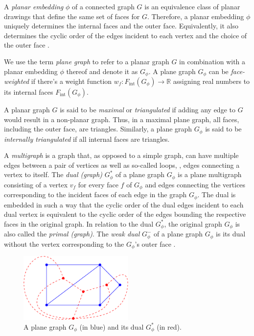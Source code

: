 
A \emph{planar embedding} $\phi$ of a connected graph $G$ is an equivalence class of planar drawings that define the same set of faces for $G$.
Therefore, a planar embedding $\phi$ uniquely determines the internal faces and the outer face.
Equivalently, it also determines the cyclic order of the edges incident to each vertex and the choice of the outer face \cite{angelini2015monotone}.

We use the term \emph{plane graph} to refer to a planar graph $G$ in combination with a planar embedding $\phi$ thereof and denote it as $G_\phi$.
A plane graph $G_\phi$ can be \emph{face-weighted} if there's a weight function $w_f \colon F_\text{int}(G_\phi) \to \mathbb{R}$ assigning real numbers to its internal faces $F_\text{int}(G_\phi)$.


A planar graph $G$ is said to be \emph{maximal} or \emph{triangulated} if adding any edge to $G$ would result in a non-planar graph.
Thus, in a maximal plane graph, all faces, including the outer face, are triangles.
Similarly, a plane graph $G_\phi$ is said to be \emph{internally triangulated} if all internal faces are triangles.

A \emph{multigraph} is a graph that, as opposed to a simple graph, can have multiple edges between a pair of vertices as well as so-called loops, \ie{}, edges connecting a vertex to itself.
The \emph{dual (graph)} $G_\phi^*$ of a plane graph $G_\phi$ is a plane multigraph consisting of a vertex $v_f$ for every face $f$ of $G_\phi$ and edges connecting the vertices corresponding to the incident faces of each edge in the graph $G_\phi$.
The dual is embedded in such a way that the cyclic order of the dual edges incident to each dual vertex is equivalent to the cyclic order of the edges bounding the respective faces in the original graph.
In relation to the dual $G_\phi^*$, the original graph $G_\phi$ is also called the \emph{primal (graph)}.
The \emph{weak dual} $G_\phi^-$ of a plane graph $G_\phi$ is its dual without the vertex corresponding to the $G_\phi$'s outer face \cite{fleischner1974}.

\begin{figure}[H]
	\centering\includegraphics[height=130px]{Resources/Preliminaries-Dual.pdf}
	\caption{A plane graph $G_\phi$ (in blue) and its dual $G_\phi^*$ (in red).}
	\label{fig:preliminaries-dual}
\end{figure}

